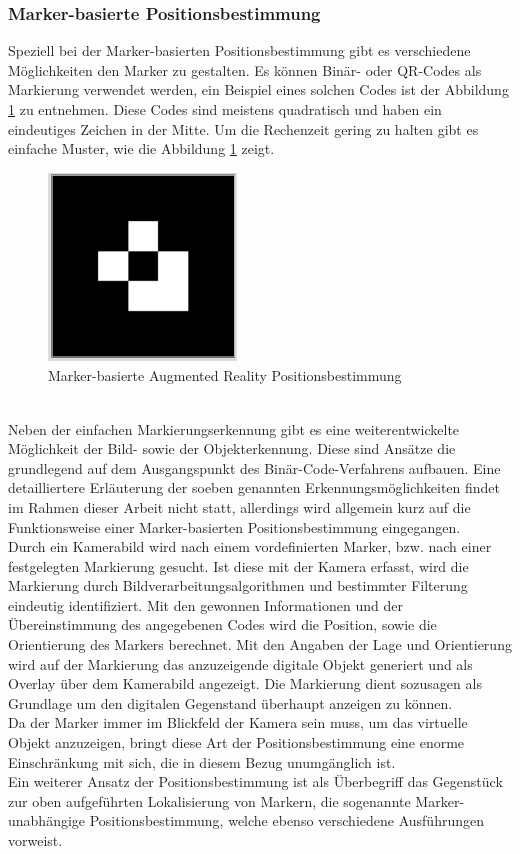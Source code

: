 \subsubsection*{Marker-basierte Positionsbestimmung}
Speziell bei der Marker-basierten Positionsbestimmung gibt es verschiedene Möglichkeiten den Marker zu gestalten. Es können 
Binär- oder QR-Codes als Markierung verwendet werden, ein Beispiel eines solchen Codes ist der Abbildung \ref{pic:markerARpos} zu entnehmen. 
Diese Codes sind meistens quadratisch und haben ein eindeutiges Zeichen in der Mitte. Um die Rechenzeit gering zu halten gibt es einfache Muster, 
wie die Abbildung \ref{pic:markerARpos} zeigt.
\begin{figure}[hbt!]
    \centering
    \includegraphics[width=5cm,height=5cm,keepaspectratio]{2Grundlagen/Bilder/bildmarkerAR.png}
    \caption{Marker-basierte Augmented Reality Positionsbestimmung}
    \label{pic:markerARpos}
\end{figure}
\pagebreak
\\ 
\linebreak
Neben der einfachen Markierungserkennung gibt es eine weiterentwickelte Möglichkeit der Bild- sowie der Objekterkennung. Diese sind Ansätze 
die grundlegend auf dem Ausgangspunkt des Binär-Code-Verfahrens aufbauen. Eine detailliertere Erläuterung der soeben genannten 
Erkennungsmöglichkeiten findet im Rahmen dieser Arbeit nicht statt, allerdings wird allgemein kurz auf die Funktionsweise einer 
Marker-basierten Positionsbestimmung eingegangen.
\\ 
Durch ein Kamerabild wird nach einem vordefinierten Marker, bzw. nach einer festgelegten Markierung gesucht. Ist diese mit der Kamera erfasst, 
wird die Markierung durch Bildverarbeitungsalgorithmen und bestimmter Filterung eindeutig identifiziert. Mit den gewonnen Informationen und 
der Übereinstimmung des angegebenen Codes wird die Position, sowie die Orientierung des Markers berechnet. Mit den Angaben der Lage und 
Orientierung wird auf der Markierung das anzuzeigende digitale Objekt generiert und als Overlay über dem Kamerabild angezeigt. Die Markierung 
dient sozusagen als Grundlage um den digitalen Gegenstand überhaupt anzeigen zu können.
\\ 
Da der Marker immer im Blickfeld der Kamera sein muss, um das virtuelle Objekt anzuzeigen, bringt diese Art der Positionsbestimmung eine 
enorme Einschränkung mit sich, die in diesem Bezug unumgänglich ist. 
\\ 
\linebreak
Ein weiterer Ansatz der Positionsbestimmung ist als Überbegriff das Gegenstück zur oben aufgeführten Lokalisierung von Markern, die 
sogenannte Marker-unabhängige Positionsbestimmung, welche ebenso verschiedene Ausführungen vorweist. 
